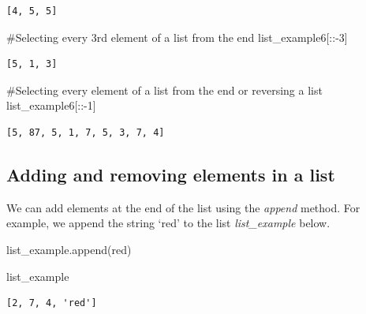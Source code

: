 \documentclass[
  letterpaper,
  DIV=11,
  numbers=noendperiod]{scrreprt}
\newenvironment{Shaded}{\begin{snugshade}}{\end{snugshade}}
\newcommand{\CommentTok}[1]{\textcolor[rgb]{0.37,0.37,0.37}{#1}}
\newcommand{\DecValTok}[1]{\textcolor[rgb]{0.68,0.00,0.00}{#1}}
\newcommand{\NormalTok}[1]{\textcolor[rgb]{0.00,0.23,0.31}{#1}}
\newcommand{\OperatorTok}[1]{\textcolor[rgb]{0.37,0.37,0.37}{#1}}
\newcommand{\StringTok}[1]{\textcolor[rgb]{0.13,0.47,0.30}{#1}}
\begin{document}
\begin{verbatim}
[4, 5, 5]
\end{verbatim}

\begin{Shaded}
\begin{Highlighting}[]
\CommentTok{\#Selecting every 3rd element of a list from the end}
\NormalTok{list\_example6[::}\OperatorTok{{-}}\DecValTok{3}\NormalTok{]}
\end{Highlighting}
\end{Shaded}

\begin{verbatim}
[5, 1, 3]
\end{verbatim}

\begin{Shaded}
\begin{Highlighting}[]
\CommentTok{\#Selecting every element of a list from the end or reversing a list }
\NormalTok{list\_example6[::}\OperatorTok{{-}}\DecValTok{1}\NormalTok{]}
\end{Highlighting}
\end{Shaded}

\begin{verbatim}
[5, 87, 5, 1, 7, 5, 3, 7, 4]
\end{verbatim}

\hypertarget{adding-and-removing-elements-in-a-list}{%
\subsection{Adding and removing elements in a
list}\label{adding-and-removing-elements-in-a-list}}

We can add elements at the end of the list using the \emph{append}
method. For example, we append the string `red' to the list
\emph{list\_example} below.

\begin{Shaded}
\begin{Highlighting}[]
\NormalTok{list\_example.append(}\StringTok{\textquotesingle{}red\textquotesingle{}}\NormalTok{)}
\end{Highlighting}
\end{Shaded}

\begin{Shaded}
\begin{Highlighting}[]
\NormalTok{list\_example}
\end{Highlighting}
\end{Shaded}

\begin{verbatim}
[2, 7, 4, 'red']
\end{verbatim}
\end{document}
